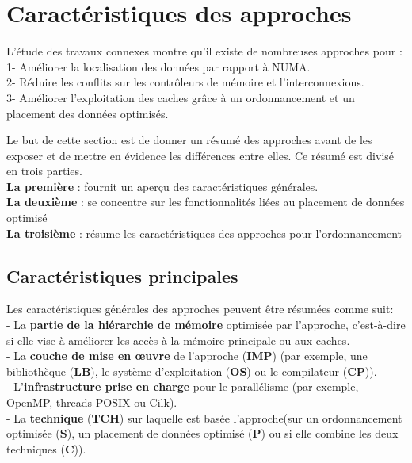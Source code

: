 \section{Caractéristiques des approches} \label{caracAppro}
L'étude des travaux connexes montre qu'il existe de nombreuses approches pour :\\ %
1- Améliorer la localisation des données par rapport à NUMA.\\
2- Réduire les conflits sur les contrôleurs de mémoire et l’interconnexions.\\
3- Améliorer l'exploitation des caches grâce à un ordonnancement et un placement des données optimisés.

Le but de cette section est de donner un résumé des approches avant de les exposer et de mettre en évidence les différences entre elles. 
Ce résumé est divisé en trois parties. \\
\textbf{La première} : fournit un aperçu des caractéristiques générales. \\
\textbf{La deuxième} : se concentre sur les fonctionnalités liées au placement de données optimisé\\
\textbf{La troisième} : résume les caractéristiques des approches pour l'ordonnancement
%
\subsection{Caractéristiques principales}
Les caractéristiques générales des approches peuvent être résumées comme suit: \\
- La \textbf{partie de la hiérarchie de mémoire} optimisée par l'approche, c'est-à-dire si elle vise à améliorer les accès à la mémoire principale ou aux caches.\\ 
- La \textbf{couche de mise en œuvre} de l'approche (\textbf{IMP}) (par exemple, une bibliothèque (\textbf{LB}), le système d'exploitation (\textbf{OS}) ou le compilateur (\textbf{CP})).\\ 
- L'\textbf{infrastructure prise en charge} pour le parallélisme (par exemple, OpenMP, threads POSIX ou Cilk). \\
- La \textbf{technique} (\textbf{TCH}) sur laquelle est basée l'approche(sur un ordonnancement optimisée (\textbf{S}), un placement de données optimisé (\textbf{P}) ou si elle combine les deux techniques (\textbf{C})). 
%
